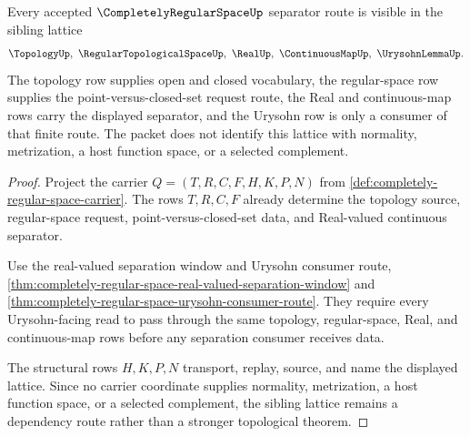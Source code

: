\begin{theorem}
\label{thm:completely-regular-space-sibling-lattice}
Every accepted $\CompletelyRegularSpaceUp$ separator route is visible in the sibling lattice
$$
\TopologyUp,\ \RegularTopologicalSpaceUp,\ \RealUp,\ \ContinuousMapUp,\ \UrysohnLemmaUp .
$$
The topology row supplies open and closed vocabulary, the regular-space row supplies the point-versus-closed-set request route, the Real and continuous-map rows carry the displayed separator, and the Urysohn row is only a consumer of that finite route. The packet does not identify this lattice with normality, metrization, a host function space, or a selected complement.
\end{theorem}
\begin{proof}
Project the carrier $Q=(T,R,C,F,H,K,P,N)$ from \autoref{def:completely-regular-space-carrier}. The rows $T,R,C,F$ already determine the topology source, regular-space request, point-versus-closed-set data, and Real-valued continuous separator.

Use the real-valued separation window and Urysohn consumer route, \autoref{thm:completely-regular-space-real-valued-separation-window} and \autoref{thm:completely-regular-space-urysohn-consumer-route}. They require every Urysohn-facing read to pass through the same topology, regular-space, Real, and continuous-map rows before any separation consumer receives data.

The structural rows $H,K,P,N$ transport, replay, source, and name the displayed lattice. Since no carrier coordinate supplies normality, metrization, a host function space, or a selected complement, the sibling lattice remains a dependency route rather than a stronger topological theorem.
\end{proof}
